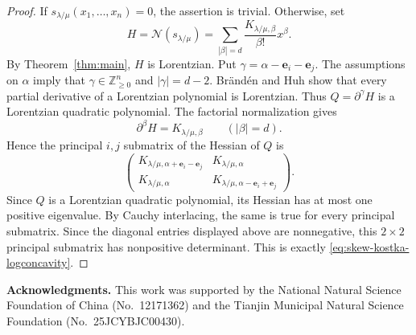\documentclass[11pt]{article}
\theoremstyle{definition}
\newcommand{\Nop}{\mathcal N}
\newcommand{\Znonneg}{\mathbb Z_{\ge0}}
\begin{document}
\begin{proof}
If $s_{\lambda/\mu}(x_1,\ldots,x_n)=0$, the assertion is trivial.  Otherwise,
set
\[
  H=\Nop(s_{\lambda/\mu})
   =\sum_{|\beta|=d}
      \frac{K_{\lambda/\mu,\beta}}{\beta!}x^\beta.
\]
By Theorem~\ref{thm:main}, $H$ is Lorentzian.  Put
$\gamma=\alpha-\mathbf e_i-\mathbf e_j$.
The assumptions on $\alpha$ imply that $\gamma\in\Znonneg^n$ and
$|\gamma|=d-2$.
Br\"and\'en and Huh
\cite[Corollary~2.11]{BH} show that every partial derivative of a Lorentzian
polynomial is Lorentzian.  Thus $Q=\partial^\gamma H$ is a Lorentzian
quadratic polynomial.  The factorial normalization gives
\[
  \partial^\beta H=K_{\lambda/\mu,\beta}
  \qquad (|\beta|=d).
\]
Hence the principal $i,j$ submatrix of the Hessian of $Q$ is
\[
  \begin{pmatrix}
    K_{\lambda/\mu,\alpha+\mathbf e_i-\mathbf e_j}
      & K_{\lambda/\mu,\alpha}\\
    K_{\lambda/\mu,\alpha}
      & K_{\lambda/\mu,\alpha-\mathbf e_i+\mathbf e_j}
  \end{pmatrix}.
\]
Since $Q$ is a Lorentzian quadratic polynomial, its Hessian has at most
one positive eigenvalue. By Cauchy interlacing, the same is true for every
principal submatrix.  Since the diagonal entries displayed above are
nonnegative, this $2\times2$ principal submatrix has nonpositive determinant.
This is exactly
\eqref{eq:skew-kostka-logconcavity}.
\end{proof}

\bigskip
\noindent\textbf{Acknowledgments.}
This work was supported by the National Natural Science Foundation of China
(No.~12171362) and the Tianjin Municipal Natural Science Foundation
(No.~25JCYBJC00430).
\end{document}

